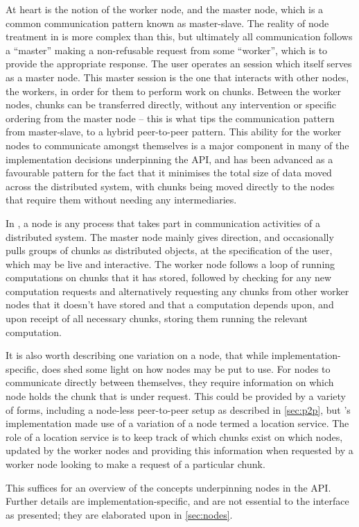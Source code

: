 At heart is the notion of the worker node, and the master node, which is a common communication pattern known as master-slave\cite{rfc2136}.
The reality of node treatment in \lsr is more complex than this, but ultimately all communication follows a ``master'' making a non-refusable request from some ``worker'', which is to provide the appropriate response.
The user operates an \R session which itself serves as a master node.
This master session is the one that interacts with other nodes, the workers, in order for them to perform work on chunks.
Between the worker nodes, chunks can be transferred directly, without any intervention or specific ordering from the master node -- this is what tips the communication pattern from master-slave, to a hybrid peer-to-peer pattern.
This ability for the worker nodes to communicate amongst themselves is a major component in many of the implementation decisions underpinning the API, and has been advanced as a favourable pattern for the fact that it minimises the total size of data moved across the distributed system, with chunks being moved directly to the nodes that require them without needing any intermediaries.

In \lsr, a node is any process that takes part in communication activities of a distributed system.
The master node mainly gives direction, and occasionally pulls groups of chunks as distributed objects, at the specification of the user, which may be live and interactive.
The worker node follows a loop of running computations on chunks that it has stored, followed by checking for any new computation requests and alternatively requesting any chunks from other worker nodes that it doesn't have stored and that a computation depends upon, and upon receipt of all necessary chunks, storing them running the relevant computation.

It is also worth describing one variation on a node, that while implementation-specific, does shed some light on how nodes may be put to use.
For nodes to communicate directly between themselves, they require information on which node holds the chunk that is under request.
This could be provided by a variety of forms, including a node-less peer-to-peer setup as described in \cref{sec:p2p}, but \lsr's implementation made use of a variation of a node termed a location service.
The role of a location service is to keep track of which chunks exist on which nodes, updated by the worker nodes and providing this information when requested by a worker node looking to make a request of a particular chunk.

This suffices for an overview of the concepts underpinning nodes in the API.
Further details are implementation-specific, and are not essential to the interface as presented; they are elaborated upon in \cref{sec:nodes}.
